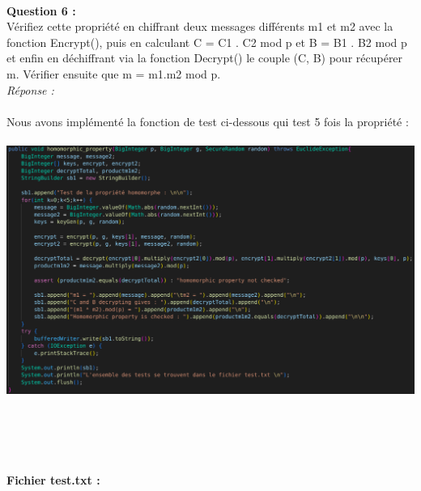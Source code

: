 \documentclass[a4paper,11pt]{article}
\begin{document}
        \textbf{\\Question 6 : \\}Vérifiez cette propriété en chiffrant deux messages différents m1 et m2 avec la fonction Encrypt(), puis en calculant C = C1 . C2 mod p et B = B1 . B2 mod p et enfin en déchiffrant via la fonction Decrypt() le couple (C, B) pour récupérer m. Vérifier ensuite que m = m1.m2 mod p.
        \textit{\\Réponse :} \\\\Nous avons implémenté la fonction de test ci-dessous qui test 5 fois la propriété : \\\\\includegraphics[scale=0.3]{assets/homo_prop.png}\\\\\\\


        \textbf{\\Fichier test.txt : }
\end{document}
